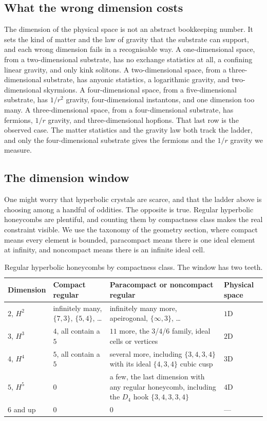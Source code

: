 \subsection{What the wrong dimension costs}

The dimension of the physical space is not an abstract bookkeeping number. It sets the kind of matter and the law
of gravity that the substrate can support, and each wrong dimension fails in a recognisable way. A
one-dimensional space, from a two-dimensional substrate, has no exchange statistics at all, a confining linear
gravity, and only kink solitons. A two-dimensional space, from a three-dimensional substrate, has anyonic
statistics, a logarithmic gravity, and two-dimensional skyrmions. A four-dimensional space, from a
five-dimensional substrate, has $1/r^2$ gravity, four-dimensional instantons, and one dimension too many. A
three-dimensional space, from a four-dimensional substrate, has fermions, $1/r$ gravity, and three-dimensional
hopfions. That last row is the observed case. The matter statistics and the gravity law both track the ladder,
and only the four-dimensional substrate gives the fermions and the $1/r$ gravity we measure.

\subsection{The dimension window}

One might worry that hyperbolic crystals are scarce, and that the ladder above is choosing among a handful of
oddities. The opposite is true. Regular hyperbolic honeycombs are plentiful, and counting them by compactness
class makes the real constraint visible. We use the taxonomy of the geometry section, where compact means every
element is bounded, paracompact means there is one ideal element at infinity, and noncompact means there is an
infinite ideal cell.

\begin{table}[ht]
\centering
\begin{tabularx}{\textwidth}{p{2.2cm}p{2.6cm}Xp{1.6cm}}
\toprule
Dimension & Compact regular & Paracompact or noncompact regular & Physical space \\
\midrule
$2$, $H^2$ & infinitely many, $\{7,3\}$, $\{5,4\}$, \dots & infinitely many more, apeirogonal, $\{\infty,3\}$, \dots & $1$D \\
$3$, $H^3$ & $4$, all contain a $5$ & $11$ more, the $3$/$4$/$6$ family, ideal cells or vertices & $2$D \\
$4$, $H^4$ & $5$, all contain a $5$ & several more, including $\{3,4,3,4\}$ with its ideal $\{4,3,4\}$ cubic cusp & $3$D \\
$5$, $H^5$ & $0$ & a few, the last dimension with any regular honeycomb, including the $D_4$ hook $\{3,4,3,3,4\}$ & $4$D \\
$6$ and up & $0$ & $0$ & --- \\
\bottomrule
\end{tabularx}
\caption{Regular hyperbolic honeycombs by compactness class. The window has two teeth.}
\end{table}


